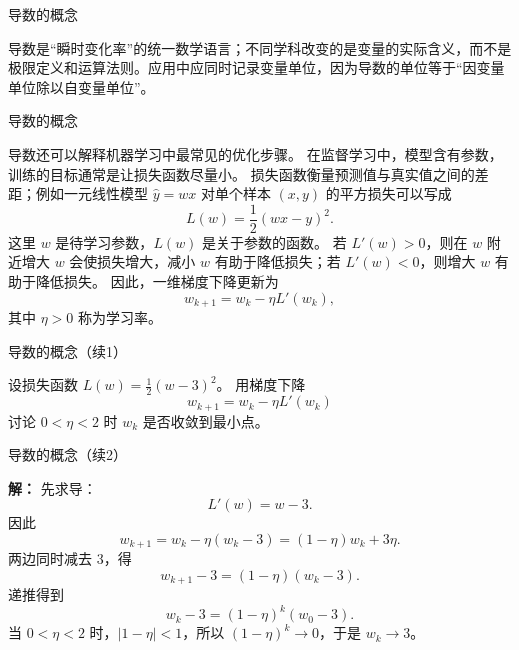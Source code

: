 \documentclass[aspectratio=169,10pt,fontset=fandol]{ctexbeamer}
\renewenvironment{solution}{\par\noindent\textbf{解：}\quad}{\par}
\begin{document}
\begin{frame}[t,fragile]{导数的概念}
\footnotesize
{\footnotesize
导数是“瞬时变化率”的统一数学语言；不同学科改变的是变量的实际含义，而不是极限定义和运算法则。应用中应同时记录变量单位，因为导数的单位等于“因变量单位除以自变量单位”。


}
\end{frame}
\begin{frame}[t,fragile]{导数的概念}
\footnotesize
{\footnotesize
\begin{application}[导数与梯度下降的基本思想]
	
	导数还可以解释机器学习中最常见的优化步骤。 在监督学习中，模型含有参数，训练的目标通常是让损失函数尽量小。 损失函数衡量预测值与真实值之间的差距；例如一元线性模型 $\hat y=wx$ 对单个样本 $(x,y)$ 的平方损失可以写成
	\[
	L(w)=\frac12(wx-y)^2.
	\]
	这里 $w$ 是待学习参数，$L(w)$ 是关于参数的函数。 若 $L'(w)>0$，则在 $w$ 附近增大 $w$ 会使损失增大，减小 $w$ 有助于降低损失；若 $L'(w)<0$，则增大 $w$ 有助于降低损失。 因此，一维梯度下降更新为
	\[
	w_{k+1}=w_k-\eta L'(w_k),
	\]
	其中 $\eta>0$ 称为学习率。
	

\end{application}
}
\end{frame}
\begin{frame}[t,fragile]{导数的概念（续1）}
\footnotesize
{\footnotesize
\begin{application}[导数与梯度下降的基本思想]
	\begin{example}
		设损失函数 $L(w)=\frac12(w-3)^2$。 用梯度下降
		\[
		w_{k+1}=w_k-\eta L'(w_k)
		\]
		讨论 $0<\eta<2$ 时 $w_k$ 是否收敛到最小点。
	\end{example}
\end{application}
}
\end{frame}
\begin{frame}[t,fragile]{导数的概念（续2）}
\footnotesize
{\footnotesize
\begin{application}[导数与梯度下降的基本思想]

	\begin{solution}
		先求导：
		\[
		L'(w)=w-3.
		\]
		因此
		\[
		w_{k+1}=w_k-\eta(w_k-3)=(1-\eta)w_k+3\eta.
		\]
		两边同时减去 $3$，得
		\[
		w_{k+1}-3=(1-\eta)(w_k-3).
		\]
		递推得到
		\[
		w_k-3=(1-\eta)^k(w_0-3).
		\]
		当 $0<\eta<2$ 时，$|1-\eta|<1$，所以 $(1-\eta)^k\to0$，于是 $w_k\to3$。
\end{solution}
	
\end{application}
}
\end{frame}
\end{document}
